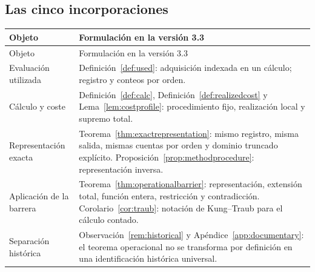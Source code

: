 \documentclass[11pt,a4paper]{article}
\numberwithin{equation}{section}
\theoremstyle{definition}
\theoremstyle{remark}
\begin{document}
\subsection{Las cinco incorporaciones}
\begin{longtable}{@{}p{}p{}@{}}
\toprule
Objeto & Formulación en la versión 3.3\\\midrule
\endfirsthead
\toprule Objeto & Formulación en la versión 3.3\\\midrule\endhead
Evaluación utilizada & Definición~\ref{def:used}: adquisición indexada en un cálculo; registro y conteos por orden.\\[4pt]
Cálculo y coste & Definición~\ref{def:calc}, Definición~\ref{def:realizedcost} y Lema~\ref{lem:costprofile}: procedimiento fijo, realización local y supremo total.\\[4pt]
Representación exacta & Teorema~\ref{thm:exactrepresentation}: mismo registro, misma salida, mismas cuentas por orden y dominio truncado explícito. Proposición~\ref{prop:methodprocedure}: representación inversa.\\[4pt]
Aplicación de la barrera & Teorema~\ref{thm:operationalbarrier}: representación, extensión total, función entera, restricción y contradicción. Corolario~\ref{cor:traub}: notación de Kung--Traub para el cálculo contado.\\[4pt]
Separación histórica & Observación~\ref{rem:historical} y Apéndice~\ref{app:documentary}: el teorema operacional no se transforma por definición en una identificación histórica universal.\\
\bottomrule
\end{longtable}
\end{document}
